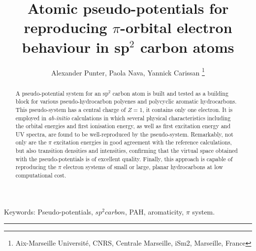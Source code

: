 \documentclass[12pt]{article}
\title{Atomic pseudo-potentials for reproducing $\pi$-orbital electron behaviour in sp$^2$ carbon atoms}
\author{Alexander Punter, Paola Nava, Yannick Carissan \thanks{Aix-Marseille Universit\'e, CNRS, Centrale Marseille, iSm2, Marseille, France}}
\newenvironment{wileykeywords}{\textsf{Keywords:}\hspace{\stretch{1}}}{\hspace{\stretch{1}}\rule{1ex}{1ex}}
\begin{document}
\maketitle

\begin{abstract}
A pseudo-potential system for an sp\(^{2}\) carbon atom is built and tested as a building block for various pseudo-hydrocarbon polyenes and polycyclic aromatic hydrocarbons.  
This pseudo-system has a central charge of $Z=1$, it contains only one electron.
It is employed in \textsl{ab-initio} calculations in which several physical characteristics 
including the orbital energies and first ionisation energy, as well as first excitation energy and UV spectra, are found to be well-reproduced by the pseudo-system. 
Remarkably, not only are the $\pi$ excitation energies in good agreement with the reference calculations, but also transition
densities and intensities, confirming that the virtual space obtained with the pseudo-potentials is of excellent quality.
Finally, this approach is capable of reproducing the $\pi$ electron systems of small or large, planar hydrocarbons at low computational cost.
\end{abstract}

\begin{wileykeywords}
Pseudo-potentials, $sp^2 carbon$, PAH, aromaticity, $\pi$ system.
\end{wileykeywords}

\clearpage

\begin{figure}[h]
\centering
\colorbox{background-color}{
}
\end{figure}
\end{document}
